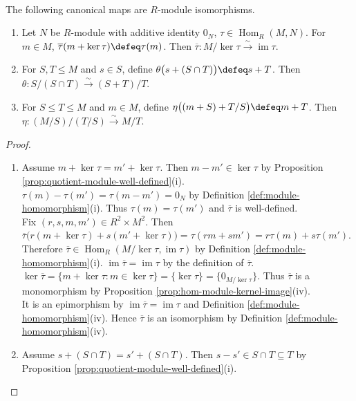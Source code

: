 \begin{theorem} \label{thm:module-isomorphism-theorems} \\
The following canonical maps are $R$-module isomorphisms.
\begin{enumerate}[label=(\roman*)]
\setlength{\itemsep}{0pt}
\item Let $N$ be $R$-module with additive identity $0_N$, $\tau\in\operatorname{Hom}_R(M,N)$. For $m\in M$, $\overline{\tau}(m+\ker\tau)\defeq\tau(m)$. Then $\overline{\tau}:M/\ker\tau\xrightarrow{\sim}\operatorname{im}\tau$.
\item For $S,T\leq M$ and $s\in S$, define $\theta\bigl(s+(S\cap T)\bigr)\defeq s+T$. Then $\theta:S/(S\cap T)\xrightarrow{\sim}(S+T)/T$.
\item For $S\leq T\leq M$ and $m\in M$, define $\eta\bigl((m+S)+T/S\bigr)\defeq m+T$. Then $\eta:(M/S)/(T/S)\xrightarrow{\sim}M/T$.
\end{enumerate}
\begin{proof}
\begin{enumerate}[label=(\roman*)]
\setlength{\itemsep}{0pt}
\item Assume $m+\ker\tau=m'+\ker\tau$. Then $m-m'\in\ker\tau$ by Proposition \ref{prop:quotient-module-well-defined}(i).\\
$\tau(m)-\tau(m')=\tau(m-m')=0_N$ by Definition \ref{def:module-homomorphism}(i). Thus $\tau(m)=\tau(m')$ and $\overline{\tau}$ is well-defined.\\
Fix $(r,s,m,m')\in R^2\times M^2$. Then $\overline{\tau}\bigl(r(m+\ker\tau)+s(m'+\ker\tau)\bigr)=\tau(rm+sm')=r\tau(m)+s\tau(m')$.\\
Therefore $\overline{\tau}\in\operatorname{Hom}_R(M/\ker\tau,\operatorname{im}\tau)$ by Definition \ref{def:module-homomorphism}(i). $\operatorname{im}\overline{\tau}=\operatorname{im}\tau$ by the definition of $\overline{\tau}$.\\
$\ker\overline{\tau}=\{m+\ker\tau:m\in\ker\tau\}=\{\ker\tau\}=\{0_{M/\ker\tau}\}$. Thus $\overline{\tau}$ is a monomorphism by Proposition \ref{prop:hom-module-kernel-image}(iv).\\
It is an epimorphism by $\operatorname{im}\overline{\tau}=\operatorname{im}\tau$ and Definition \ref{def:module-homomorphism}(iv). Hence $\overline{\tau}$ is an isomorphism by Definition \ref{def:module-homomorphism}(iv).
\item Assume $s+(S\cap T)=s'+(S\cap T)$. Then $s-s'\in S\cap T\subseteq T$ by Proposition \ref{prop:quotient-module-well-defined}(i).\\

\end{enumerate}
\end{proof}
\end{theorem}
